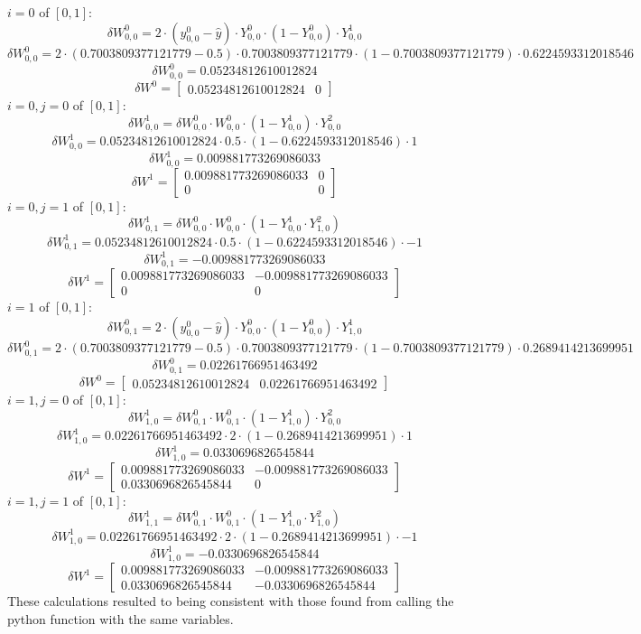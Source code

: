 \documentclass[10pt]{article}
\begin{document}
$i = 0$ of $[0,1]$:
$$\delta W^0_{0,0} = 2 \cdot (y^0_{0,0} - \hat{y} ) \cdot Y^0_{0,0} \cdot (1 - Y^0_{0,0}) \cdot Y^1_{0,0}$$
$$\delta W^0_{0,0} = 2 \cdot (0.7003809377121779 - 0.5) \cdot 0.7003809377121779 \cdot (1 - 0.7003809377121779) \cdot 0.6224593312018546$$
$$\delta W^0_{0,0} = 0.05234812610012824$$
$$\delta W^0 = \begin{bmatrix}0.05234812610012824&0\end{bmatrix}$$
$i = 0, j = 0$ of $[0,1]$:
$$\delta W^1_{0,0} = \delta W^0_{0,0} \cdot W^0_{0,0} \cdot (1 - Y^1_{0,0}) \cdot Y^2_{0,0}$$
$$\delta W^1_{0,0} = 0.05234812610012824 \cdot 0.5 \cdot (1 - 0.6224593312018546) \cdot 1$$
$$\delta W^1_{0,0} = 0.009881773269086033$$
$$\delta W^1 = \begin{bmatrix}0.009881773269086033&0\\0&0\end{bmatrix}$$
$i = 0, j = 1$ of $[0,1]$:
$$\delta W^1_{0,1} = \delta W^0_{0,0} \cdot W^0_{0,0} \cdot (1 - Y^1_{0,0} \cdot Y^2_{1,0})$$
$$\delta W^1_{0,1} = 0.05234812610012824 \cdot 0.5 \cdot (1 - 0.6224593312018546) \cdot -1$$
$$\delta W^1_{0,1} = -0.009881773269086033$$
$$\delta W^1 = \begin{bmatrix}0.009881773269086033&-0.009881773269086033\\0&0\end{bmatrix}$$
$i = 1$ of $[0,1]$:
$$\delta W^0_{0,1} = 2 \cdot (y^0_{0,0} - \hat{y} ) \cdot Y^0_{0,0} \cdot (1 - Y^0_{0,0}) \cdot Y^1_{1,0}$$
$$\delta W^0_{0,1} = 2 \cdot (0.7003809377121779 - 0.5) \cdot 0.7003809377121779 \cdot (1 - 0.7003809377121779) \cdot 0.2689414213699951$$
$$\delta W^0_{0,1} = 0.02261766951463492$$
$$\delta W^0 = \begin{bmatrix}0.05234812610012824&0.02261766951463492\end{bmatrix}$$
$i = 1, j = 0$ of $[0,1]$:
$$\delta W^1_{1,0} = \delta W^0_{0,1} \cdot W^0_{0,1} \cdot (1 - Y^1_{1,0}) \cdot Y^2_{0,0}$$
$$\delta W^1_{1,0} = 0.02261766951463492 \cdot 2 \cdot (1 - 0.2689414213699951) \cdot 1$$
$$\delta W^1_{1,0} = 0.0330696826545844$$
$$\delta W^1 = \begin{bmatrix}0.009881773269086033&-0.009881773269086033\\0.0330696826545844&0\end{bmatrix}$$
$i = 1, j = 1$ of $[0,1]$:
$$\delta W^1_{1,1} = \delta W^0_{0,1} \cdot W^0_{0,1} \cdot (1 - Y^1_{1,0} \cdot Y^2_{1,0})$$
$$\delta W^1_{1,0} = 0.02261766951463492 \cdot 2 \cdot (1 - 0.2689414213699951) \cdot -1$$
$$\delta W^1_{1,0} = -0.0330696826545844$$
$$\delta W^1 = \begin{bmatrix}0.009881773269086033&-0.009881773269086033\\0.0330696826545844&-0.0330696826545844\end{bmatrix}$$
These calculations resulted to being consistent with those found from calling the python function with the same variables.
\end{document}
